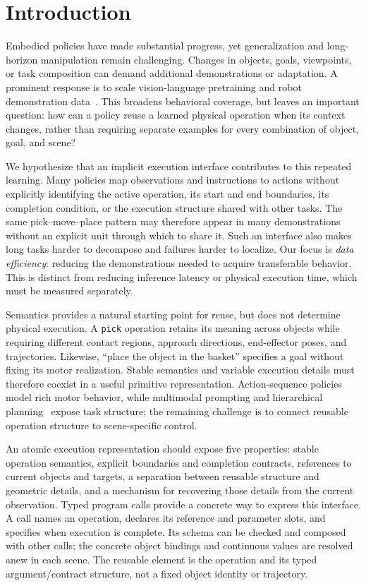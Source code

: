 \section{Introduction}
\label{sec:intro}

Embodied policies have made substantial progress, yet generalization and long-horizon manipulation remain challenging. Changes in objects, goals, viewpoints, or task composition can demand additional demonstrations or adaptation. A prominent response is to scale vision-language pretraining and robot demonstration data~\cite{rt1,rt2,palme,oxembodiment,octo,openvla,pi05,oft}. This broadens behavioral coverage, but leaves an important question: how can a policy reuse a learned physical operation when its context changes, rather than requiring separate examples for every combination of object, goal, and scene?

We hypothesize that an implicit execution interface contributes to this repeated learning. Many policies map observations and instructions to actions without explicitly identifying the active operation, its start and end boundaries, its completion condition, or the execution structure shared with other tasks. The same pick--move--place pattern may therefore appear in many demonstrations without an explicit unit through which to share it. Such an interface also makes long tasks harder to decompose and failures harder to localize. Our focus is \emph{data efficiency}: reducing the demonstrations needed to acquire transferable behavior. This is distinct from reducing inference latency or physical execution time, which must be measured separately.

Semantics provides a natural starting point for reuse, but does not determine physical execution. A \texttt{pick} operation retains its meaning across objects while requiring different contact regions, approach directions, end-effector poses, and trajectories. Likewise, ``place the object in the basket'' specifies a goal without fixing its motor realization. Stable semantics and variable execution details must therefore coexist in a useful primitive representation. Action-sequence policies~\cite{diffpolicy,act} model rich motor behavior, while multimodal prompting and hierarchical planning~\cite{vima,saycan,progprompt,inner} expose task structure; the remaining challenge is to connect reusable operation structure to scene-specific control.

An atomic execution representation should expose five properties: stable operation semantics, explicit boundaries and completion contracts, references to current objects and targets, a separation between reusable structure and geometric details, and a mechanism for recovering those details from the current observation. Typed program calls provide a concrete way to express this interface. A call names an operation, declares its reference and parameter slots, and specifies when execution is complete. Its schema can be checked and composed with other calls; the concrete object bindings and continuous values are resolved anew in each scene. The reusable element is the operation and its typed argument/contract structure, not a fixed object identity or trajectory.

